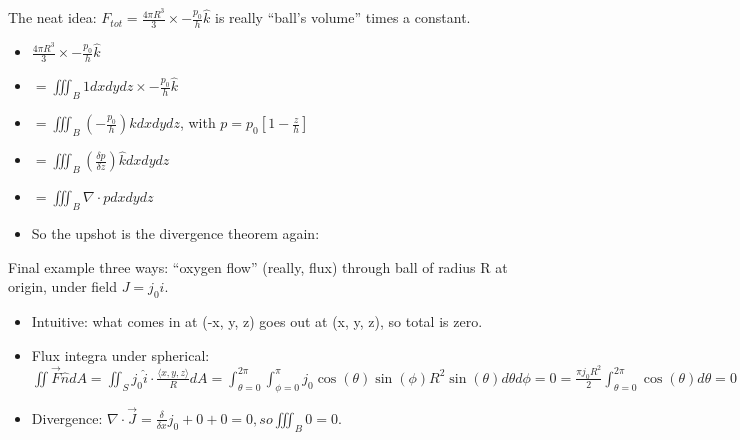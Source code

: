 \documentclass[11pt, oneside]{article}   	%
\begin{document}
The neat idea: $F_{tot} = \frac{4\pi R^3}{3} \times -\frac{p_0}{h}\hat{k}$ is really ``ball's volume'' times a constant.
\begin{itemize}
\item $\frac{4\pi R^3}{3} \times  -\frac{p_0}{h}\hat{k}$
\item $= \iiint_B 1 dx dy dz  \times  -\frac{p_0}{h}\hat{k}$

\item $= \iiint_B( -\frac{p_0}{h})\hat{k} dx dy dz$, with $p = p_0[1-\frac{z}{h}]$
\item $=  \iiint_B(\frac{\delta p}{\delta z}) \hat{k} dx dy dz$
\item $=  \iiint_B \nabla \cdot p dx dy dz$
\item So the upshot is the divergence theorem again:
\end{itemize}

Final example three ways: ``oxygen flow'' (really, flux) through ball of radius R at origin, under field $J = j_0\hat{i}$.
\begin{itemize}
\item Intuitive: what comes in at (-x, y, z)  goes out at (x, y, z), so total is zero.
\item Flux integra under spherical: $\iint \vec{F} \hat{n} dA = \iint_S j_0\hat{i} \cdot \frac{\langle x,y,z \rangle }{R} dA = \int_{\theta = 0}^{2\pi}\int_{\phi = 0}^{\pi} j_0 \cos(\theta)\sin(\phi) R^2 \sin(\theta) d\theta d\phi = 0 = \frac{\pi j_0 R^2}{2} \int_{\theta = 0}^{2\pi} \cos(\theta) d\theta = 0$
\item Divergence: $\nabla \cdot \vec{J} = \frac{\delta}{\delta x} j_0 + 0 + 0 = 0, so \iiint_B 0 = 0$.
\end{itemize}
\end{document}
